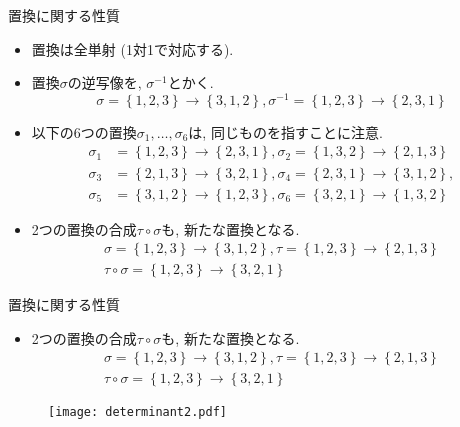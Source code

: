\documentclass[dvipdfmx,notheorems,t]{beamer}
\begin{document}
\begin{frame}{置換に関する性質}
\begin{itemize}
  \item 置換は全単射 (1対1で対応する).
  \item 置換$\sigma$の逆写像を, $\sigma^{-1}$とかく.
  $$\sigma = \left\{ 1, 2, 3 \right\} \to \left\{ 3, 1, 2 \right\},
    \sigma^{-1} = \left\{ 1, 2, 3 \right\} \to \left\{ 2, 3, 1 \right\}$$
  \item 以下の6つの置換$\sigma_1, \ldots, \sigma_6$は, 同じものを指すことに注意.
  \begin{align*}
    \sigma_1 &= \left\{ 1, 2, 3 \right\} \to \left\{ 2, 3, 1 \right\},
    \sigma_2 = \left\{ 1, 3, 2 \right\} \to \left\{ 2, 1, 3 \right\} \\
    \sigma_3 &= \left\{ 2, 1, 3 \right\} \to \left\{ 3, 2, 1 \right\},
    \sigma_4 = \left\{ 2, 3, 1 \right\} \to \left\{ 3, 1, 2 \right\}, \\
    \sigma_5 &= \left\{ 3, 1, 2 \right\} \to \left\{ 1, 2, 3 \right\},
    \sigma_6 = \left\{ 3, 2, 1 \right\} \to \left\{ 1, 3, 2 \right\}
  \end{align*}
  \item 2つの置換の合成$\tau \circ \sigma$も, 新たな置換となる.
  \begin{gather*}
    \sigma = \left\{ 1, 2, 3 \right\} \to \left\{ 3, 1, 2 \right\},
    \tau = \left\{ 1, 2, 3 \right\} \to \left\{ 2, 1, 3 \right\} \\
    \tau \circ \sigma = \left\{ 1, 2, 3 \right\} \to \left\{ 3, 2, 1 \right\}
  \end{gather*}
\end{itemize}
\end{frame}

\begin{frame}{置換に関する性質}
\begin{itemize}
  \item 2つの置換の合成$\tau \circ \sigma$も, 新たな置換となる.
  \begin{gather*}
    \sigma = \left\{ 1, 2, 3 \right\} \to \left\{ 3, 1, 2 \right\},
    \tau = \left\{ 1, 2, 3 \right\} \to \left\{ 2, 1, 3 \right\} \\
    \tau \circ \sigma = \left\{ 1, 2, 3 \right\} \to \left\{ 3, 2, 1 \right\}
  \end{gather*}
\end{itemize}

\begin{figure}
  \centering
  \texttt{[image: determinant2.pdf]}
\end{figure}
\end{frame}
\end{document}
